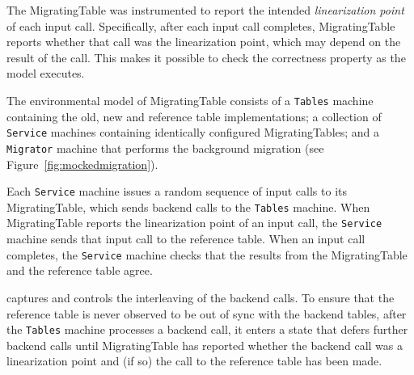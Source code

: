 
The MigratingTable was instrumented to report the intended \emph{linearization point} of each input call. Specifically, after each input call completes, MigratingTable reports whether that call was the linearization point, which may depend on the result of the call.  This makes it possible to check the correctness property as the model executes.

The \psharp environmental model of MigratingTable consists of a \texttt{Tables} machine containing the old, new and reference table implementations; a collection of \texttt{Service} machines containing identically configured MigratingTables; and a \texttt{Migrator} machine that performs the background migration (see Figure~\ref{fig:mockedmigration}).

Each \texttt{Service} machine issues a random sequence of input calls to its MigratingTable, which sends backend calls to the \texttt{Tables} machine. When MigratingTable reports the linearization point of an input call, the \texttt{Service} machine sends that input call to the reference table.  When an input call completes, the \texttt{Service} machine checks that the results from the MigratingTable and the reference table agree.

\psharp captures and controls the interleaving of the backend calls. To ensure that the reference table is never observed to be out of sync with the backend tables, after the \texttt{Tables} machine processes a backend call, it enters a state that defers further backend calls until MigratingTable has reported whether the backend call was a linearization point and (if so) the call to the reference table has been made.


